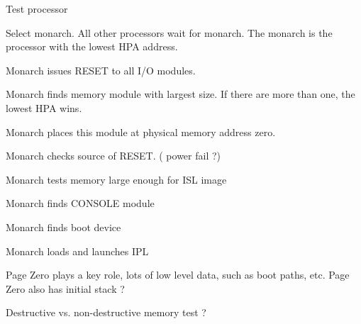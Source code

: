\begin{smallGapItemize}

\item{Test processor}

\item{Select monarch. All other processors wait for monarch. The monarch is the processor with the lowest HPA address. }

\item{Monarch issues RESET to all I/O modules.}

\item{Monarch finds memory module with largest size. If there are more than one, the lowest HPA wins.}

\item{Monarch places this module at physical memory address zero.}

\item{Monarch checks source of RESET. ( power fail ?) }

\item{Monarch tests memory large enough for ISL image }

\item{Monarch finds CONSOLE module }

\item{Monarch finds boot device }

\item{Monarch loads and launches IPL }


	
\end{smallGapItemize}

Page Zero plays a key role, lots of low level data, such as boot paths, etc.
Page Zero also has initial stack ? 

Destructive vs. non-destructive memory test ?


